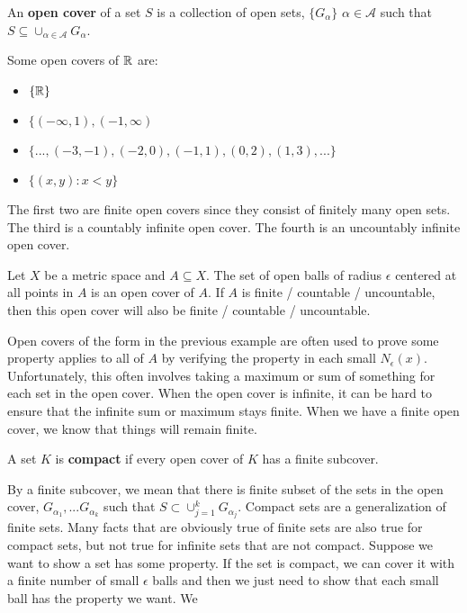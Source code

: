 \begin{definition}
  An \textbf{open cover} of a set $S$ is a collection of open sets,
  $\{G_\alpha\}$  $\alpha \in \mathcal{A}$ such that $S \subseteq
  \cup_{\alpha \in \mathcal{A}} G_\alpha$. 
\end{definition}
\begin{example}
  Some open covers of $\mathbb{R}$ are:
  \begin{itemize}
  \item $\{\mathbb{R}\}$ 
  \item $\{(-\infty, 1), (-1, \infty)$
  \item $\{..., (-3, -1), (-2, 0),(-1,1), (0,2), (1,3), ... \}$
  \item $\{(x,y) : x<y \}$
  \end{itemize}
  The first two are finite open covers since they consist of finitely
  many open sets. The third is a countably infinite open cover. The
  fourth is an uncountably infinite open cover. 
\end{example}
\begin{example}
  Let $X$ be a metric space and $A \subseteq X$. The set of open balls
  of radius $\epsilon$ centered at all points in $A$ is an open cover
  of $A$. If $A$ is finite / countable / uncountable, then this open
  cover will also be finite / countable / uncountable. 
\end{example}
Open covers of the form in the previous example are often used to
prove some property applies to all of $A$ by verifying the property in
each small $N_\epsilon(x)$. Unfortunately, this often involves taking
a maximum or sum of something for each set in the open cover. When the
open cover is infinite, it can be hard to ensure that the infinite sum
or maximum stays finite. When we have a finite open cover, we know
that things will remain finite. 
\begin{definition}
  A set $K$ is \textbf{compact} if every open cover of $K$ has a
  finite subcover. 
\end{definition}
By a finite subcover, we mean that there is finite subset of the sets
in the open cover, $G_{\alpha_1},
... G_{\alpha_k}$ such that $S \subset \cup_{j=1}^k
G_{\alpha_j}$. Compact sets are a generalization of finite sets. Many
facts that are obviously true of finite sets are also true for compact
sets, but not true for infinite sets that are not compact. Suppose we
want to show a set has some property. If the set is compact, we can
cover it with a finite number of small $\epsilon$ balls and then we
just need to show that each small ball has the property we want. We
